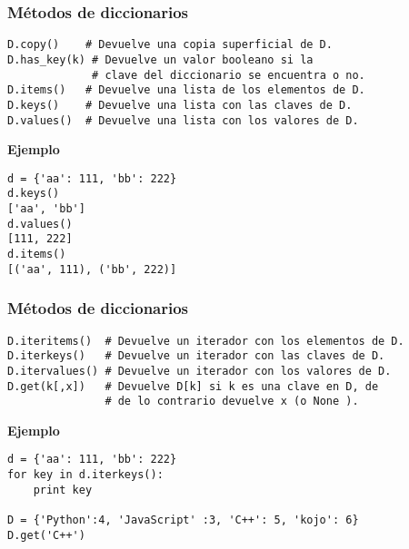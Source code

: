 \documentclass[10pt]{beamer}
\begin{document}
\begin{frame}[fragile]
\frametitle{M\'etodos de diccionarios}

\vspace{0.2cm}

\begin{lstlisting}
D.copy()    # Devuelve una copia superficial de D.
D.has_key(k) # Devuelve un valor booleano si la 
             # clave del diccionario se encuentra o no.
D.items()   # Devuelve una lista de los elementos de D.
D.keys()    # Devuelve una lista con las claves de D.
D.values()  # Devuelve una lista con los valores de D.

\end{lstlisting}

\vspace{0.2cm}

\textbf{Ejemplo}

\begin{lstlisting}
d = {'aa': 111, 'bb': 222}
d.keys()
['aa', 'bb']
d.values()
[111, 222]
d.items()
[('aa', 111), ('bb', 222)]
\end{lstlisting}
\end{frame}


\begin{frame}[fragile]
\frametitle{M\'etodos de diccionarios}

\vspace{0.2cm}

\begin{lstlisting}
D.iteritems()  # Devuelve un iterador con los elementos de D.
D.iterkeys()   # Devuelve un iterador con las claves de D.
D.itervalues() # Devuelve un iterador con los valores de D.
D.get(k[,x])   # Devuelve D[k] si k es una clave en D, de
               # de lo contrario devuelve x (o None ).

\end{lstlisting}

\vspace{0.2cm}

\textbf{Ejemplo}

\vspace{0.2cm}

\begin{lstlisting}
d = {'aa': 111, 'bb': 222}
for key in d.iterkeys():
    print key
    
D = {'Python':4, 'JavaScript' :3, 'C++': 5, 'kojo': 6}
D.get('C++')
\end{lstlisting}

\end{frame}
\end{document}

